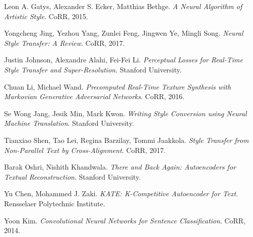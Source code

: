 \documentclass{article}
\begin{document}
\begin{thebibliography}{9}
	Leon A. Gatys, Alexander S. Ecker, Matthias Bethge.
	\textit{A Neural Algorithm of Artistic Style}.
	CoRR, 2015.

	Yongcheng Jing, Yezhou Yang, Zunlei Feng, Jingwen Ye, Mingli Song.
	\textit{Neural Style Transfer: A Review}.
	CoRR, 2017.

	Justin Johnson, Alexandre Alahi, Fei-Fei Li.
	\textit{Perceptual Losses for Real-Time Style Transfer and Super-Resolution}.
	Stanford University.

	Chuan Li, Michael Wand.
	\textit{Precomputed Real-Time Texture Synthesis with Markovian Generative Adversarial Networks}.
	CoRR, 2016.

	Se Wong Jang, Jesik Min, Mark Kwon.
	\textit{Writing Style Conversion using Neural Machine Translation}.
	Stanford University.

	Tianxiao Shen, Tao Lei, Regina Barzilay, Tommi Jaakkola.
	\textit{Style Transfer from Non-Parallel Text by Cross-Alignment}.
	CoRR, 2017.

	Barak Oshri, Nishith Khandwala.
	\textit{There and Back Again: Autoencoders for Textual Reconstruction}.
	Stanford University.

	Yu Chen, Mohammed J. Zaki.
	\textit{KATE: K-Competitive Autoencoder for Text}. Rensselaer Polytechnic Institute.
	
	Yoon Kim.
	\textit{Convolutional Neural Networks for Sentence Classification}. CoRR, 2014.

\end{thebibliography}
\end{document}
